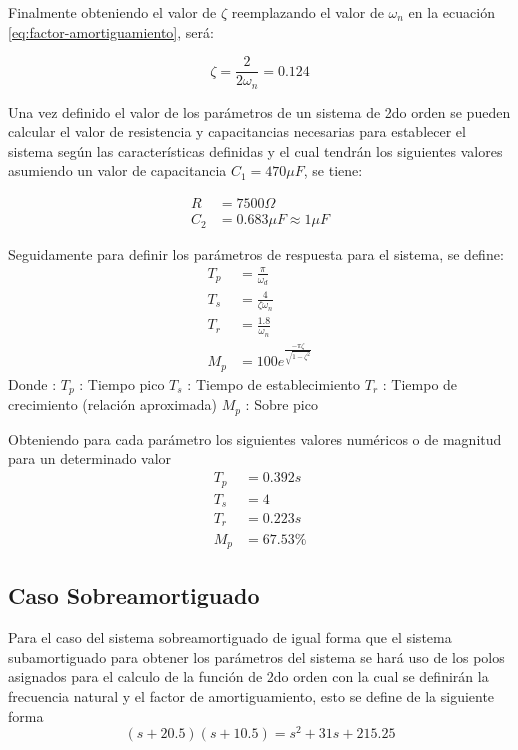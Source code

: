 \documentclass[conference]{IEEEtran}
\begin{document}
	Finalmente obteniendo el valor de $\zeta$ reemplazando el valor de $\omega_n$ en la ecuación \ref{eq:factor-amortiguamiento}, será:
	
	\begin{equation}
		\zeta = \frac{2}{ 2 \omega_n} = 0.124
	\end{equation}
	
	Una vez definido el valor de los parámetros de un sistema de 2do orden se pueden calcular el valor de resistencia y capacitancias necesarias para establecer el sistema según las características definidas y el cual tendrán los siguientes valores asumiendo un valor de capacitancia $C_1 = 470\mu F \label{eq:sub-capacitancia-c1}$, se tiene: 
	
	\begin{align}
		R &=  7500\Omega \label{eq:sub-resistencia}\\
		C_2 &= 0.683 \mu F \approx 1 \mu F \label{eq:sub-capacitancia-c2}
	\end{align}
	
	Seguidamente para definir los parámetros de respuesta para el sistema, se define: \\
	
	\begin{align}
		T_p &= \frac{\pi}{\omega_d} \\
		T_s &= \frac{4}{\zeta \omega_n} \\
		T_r &= \frac{1.8}{\omega_n} \\
		M_p &= 100e^{ \frac{-\pi \zeta}{ \sqrt{1 - \zeta^2}} }
	\end{align}
	Donde :
	$T_p$ : Tiempo pico 
	$T_s$ : Tiempo de establecimiento 
	$T_r$ : Tiempo de crecimiento (relación aproximada)
	$M_p$ : Sobre pico
	
	Obteniendo para cada parámetro los siguientes valores numéricos o de magnitud para un determinado valor
	\begin{align}
		T_p &= 0.392s \\
		T_s &= 4 \\
		T_r &= 0.223s \\
		M_p &= 67.53\%
	\end{align}
	
	
	\subsection{Caso Sobreamortiguado}
	Para el caso del sistema sobreamortiguado de igual forma que el sistema subamortiguado para obtener los parámetros del sistema se hará uso de los polos asignados para el calculo de la función de 2do orden con la cual se definirán la frecuencia natural y el factor de amortiguamiento, esto se define de la siguiente forma
	\begin{equation}
		(s + 20.5)(s + 10.5) = s^2 + 31s + 215.25
		\label{eq:sobreamortiguado}
	\end{equation}
	
\end{document}
